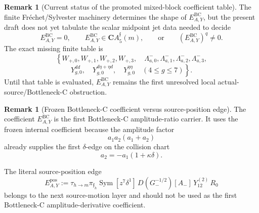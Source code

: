 \documentclass[11pt,a4paper]{amsart}
\theoremstyle{plain}
\theoremstyle{definition}
\newtheorem{remark}[theorem]{Remark}
\begin{document}
\begin{remark}[Current status of the promoted mixed-block coefficient table]
\label{rem:status-promoted-y12-coefficient-table}
The finite Fr\'echet/Sylvester machinery determines the shape of
\(E_{A,Y}^{\mathrm{BC}}\), but the present draft does not yet tabulate the
scalar midpoint jet data needed to decide
\[
E_{A,Y}^{\mathrm{BC}}=0,
\qquad
E_{A,Y}^{\mathrm{BC}}\in\mathbf C A_5^{\mathfrak f}(m),
\qquad
\text{or}\qquad
(E_{A,Y}^{\mathrm{BC}})^q\ne0.
\]
The exact missing finite table is
\[
\left\{
W_{+,0},W_{+,1},W_{+,2},W_{+,3},
\quad
\Lambda^-_{a,0},\Lambda^-_{a,1},\Lambda^-_{a,2},\Lambda^-_{a,3},
\right.
\]
\[
\left.
Y^{dd}_{g,0},\quad
Y^{d\eta+\eta d}_{g,0},\quad
Y^{\eta\eta}_{g,0}
\quad (4\le g\le7)
\right\}.
\]
Until that table is evaluated, \(E_{A,Y}^{\mathrm{BC}}\) remains the first
unresolved local actual-source/Bottleneck-C obstruction.
\end{remark}

\begin{remark}[Frozen Bottleneck-C coefficient versus source-position edge]
\label{rem:frozen-bc-coefficient-versus-source-position-edge}
The coefficient \(E_{A,Y}^{\mathrm{BC}}\) is the first Bottleneck-C
amplitude-ratio carrier.  It uses the frozen internal coefficient because the
amplitude factor
\[
a_1a_2(a_1+a_2)
\]
already supplies the first \(\delta\)-edge on the collision chart
\[
a_2=-a_1(1+\kappa\delta).
\]

The literal source-position edge
\[
E_{A,Y}^{\mathrm{pos}}
:=
\tau_{h\to m}\pi_{\mathfrak f_h}
\operatorname{Sym}
[z^7\delta^1]\,
D(G_-^{-1/2})[A_-]\,
Y_{12}^{(2)}\,
R_0
\]
belongs to the next source-motion layer and should not be used as the first
Bottleneck-C amplitude-derivative coefficient.
\end{remark}
\end{document}
